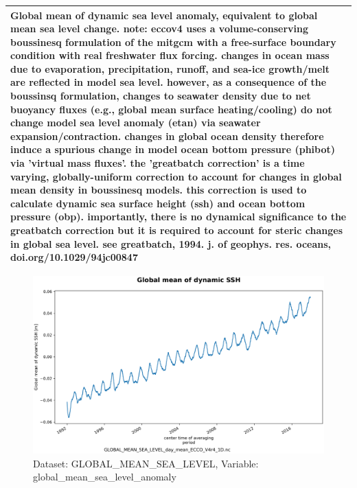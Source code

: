 \begin{longtable}{|m{}|m{}|m{}|m{}|}
\multicolumn{4}{|p{1\textwidth}|}{Global mean of dynamic sea level anomaly, equivalent to global mean sea level change. note: eccov4 uses a volume-conserving boussinesq formulation of the mitgcm with a free-surface boundary condition with real freshwater flux forcing. changes in ocean mass due to evaporation, precipitation, runoff, and sea-ice growth/melt are reflected in model sea level. however, as a consequence of the boussinsq formulation, changes to seawater density due to net buoyancy fluxes (e.g., global mean surface heating/cooling) do not change model sea level anomaly (etan) via seawater expansion/contraction. changes in global ocean density therefore induce a spurious change in model ocean bottom pressure (phibot) via 'virtual mass fluxes'. the 'greatbatch correction' is a time varying, globally-uniform correction to account for changes in global mean density in boussinesq models. this correction is used to calculate dynamic sea surface height (ssh) and ocean bottom pressure (obp). importantly, there is no dynamical significance to the greatbatch correction but it is required to account for steric changes in global sea level. see greatbatch, 1994. j. of geophys. res. oceans, doi.org/10.1029/94jc00847} \\ \hline
\end{longtable}

\begin{figure}[H]
\centering
\includegraphics[scale=0.55]{../images/plots/oneD_plots/Global_Mean_Sea_Level/global_mean_sea_level_anomaly.png}
\caption{Dataset: GLOBAL\_MEAN\_SEA\_LEVEL, Variable: global\_mean\_sea\_level\_anomaly}
\label{tab:table-GLOBAL_MEAN_SEA_LEVEL_global_mean_sea_level_anomaly-Plot}
\end{figure}
\pagebreak
